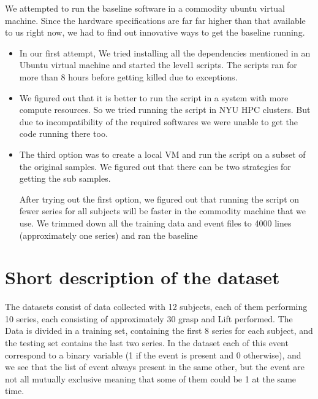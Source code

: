 \documentclass[final,leqno,onefignum,onetabnum]{siamltexmm}
\begin{document}
We attempted to run the baseline software\cite{baselineSoftware} in a commodity ubuntu virtual machine.  Since the hardware specifications\cite{hardwarespecifications} are far far higher than that available to us right now, we had to find out innovative ways to get the baseline running.

\begin{itemize}
  \item In our first attempt, We tried installing all the dependencies mentioned in an Ubuntu virtual machine and started the level1 scripts.  The scripts ran for more than 8 hours before getting killed due to exceptions.
  \item We figured out that it is better to run the script in a system with more compute resources.  So we tried running the script in NYU HPC clusters.  But due to incompatibility of the required softwares we were unable to get the code running there too.
  \item The third option was to create a local VM and run the script on a subset of the original samples.  We figured out that there can be two strategies for getting the sub samples.  
    After trying out the first option, we figured out that running the script on fewer series for all subjects will be faster in the commodity machine that we use.  We trimmed down all the training data and event files to 4000 lines (approximately one series) and ran the baseline
\end{itemize}

\section{Short description of the dataset}
The  datasets consist of data collected with 12 subjects, each of them performing 10 series, each consisting of approximately 30 grasp and Lift performed. The Data is divided in a  training set, containing the first 8 series for each subject, and  the testing set contains the last two series.
In the dataset each of this event correspond to a binary variable (1 if the event is present and 0 otherwise), and we see that the list of event always present in the same other, but the event are not all mutually exclusive meaning that some of  them could be 1 at the same time.  
\end{document}
